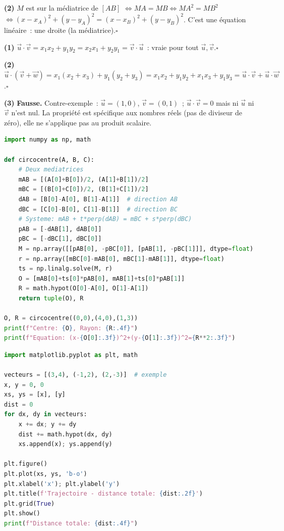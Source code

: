 \textbf{(2)} $M$ est sur la m\'ediatrice de $[AB]$
$\Leftrightarrow MA=MB\Leftrightarrow MA^2=MB^2$
$\Leftrightarrow(x-x_A)^2+(y-y_A)^2=(x-x_B)^2+(y-y_B)^2$.
C'est une \'equation lin\'eaire~: une droite (la m\'ediatrice).\hfill$\square$


\textbf{(1)} $\vec{u}\cdot\vec{v}=x_1x_2+y_1y_2=x_2x_1+y_2y_1=\vec{v}\cdot\vec{u}$~:
vraie pour tout $\vec{u},\vec{v}$.\hfill$\square$

\textbf{(2)} $\vec{u}\cdot(\vec{v}+\vec{w})=x_1(x_2+x_3)+y_1(y_2+y_3)
=x_1x_2+y_1y_2+x_1x_3+y_1y_3=\vec{u}\cdot\vec{v}+\vec{u}\cdot\vec{w}$.\hfill$\square$

\textbf{(3)} \textbf{Fausse.} Contre-exemple~: $\vec{u}=(1,0)$, $\vec{v}=(0,1)$~;
$\vec{u}\cdot\vec{v}=0$ mais ni $\vec{u}$ ni $\vec{v}$ n'est nul.
La propri\'et\'e est sp\'ecifique aux nombres r\'eels (\og pas de diviseur de z\'ero\fg),
elle ne s'applique pas au produit scalaire.


\begin{lstlisting}[language=Python]
import numpy as np, math

def circocentre(A, B, C):
    # Deux mediatrices
    mAB = [(A[0]+B[0])/2, (A[1]+B[1])/2]
    mBC = [(B[0]+C[0])/2, (B[1]+C[1])/2]
    dAB = [B[0]-A[0], B[1]-A[1]]  # direction AB
    dBC = [C[0]-B[0], C[1]-B[1]]  # direction BC
    # Systeme: mAB + t*perp(dAB) = mBC + s*perp(dBC)
    pAB = [-dAB[1], dAB[0]]
    pBC = [-dBC[1], dBC[0]]
    M = np.array([[pAB[0], -pBC[0]], [pAB[1], -pBC[1]]], dtype=float)
    r = np.array([mBC[0]-mAB[0], mBC[1]-mAB[1]], dtype=float)
    ts = np.linalg.solve(M, r)
    O = [mAB[0]+ts[0]*pAB[0], mAB[1]+ts[0]*pAB[1]]
    R = math.hypot(O[0]-A[0], O[1]-A[1])
    return tuple(O), R

O, R = circocentre((0,0),(4,0),(1,3))
print(f"Centre: {O}, Rayon: {R:.4f}")
print(f"Equation: (x-{O[0]:.3f})^2+(y-{O[1]:.3f})^2={R**2:.3f}")
\end{lstlisting}


\begin{lstlisting}[language=Python]
import matplotlib.pyplot as plt, math

vecteurs = [(3,4), (-1,2), (2,-3)]  # exemple
x, y = 0, 0
xs, ys = [x], [y]
dist = 0
for dx, dy in vecteurs:
    x += dx; y += dy
    dist += math.hypot(dx, dy)
    xs.append(x); ys.append(y)

plt.figure()
plt.plot(xs, ys, 'b-o')
plt.xlabel('x'); plt.ylabel('y')
plt.title(f'Trajectoire - distance totale: {dist:.2f}')
plt.grid(True)
plt.show()
print(f"Distance totale: {dist:.4f}")
\end{lstlisting}

